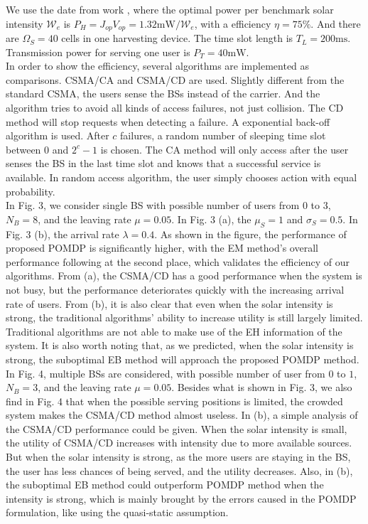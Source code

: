 \documentclass[conference]{IEEEtran}
\begin{document}
We use the date from work \cite{circuit}, where the optimal power per benchmark solar intensity \(\mathcal{W}_e\)
is \(P_H = J_{op}V_{op} = 1.32\mbox{mW}/\mathcal{W}_e\), with a efficiency \(\eta = 75 \%\).
And there are \(\Omega_S = 40\) cells in one harvesting device.
The time slot length is \(T_L = 200\mbox{ms}\).
Transmission power for serving one user is \(P_T = 40\mbox{mW}\).\\
\indent In order to show the efficiency, several algorithms are implemented as comparisons.
CSMA/CA and CSMA/CD are used.
Slightly different from the standard CSMA, the users sense the BSs instead of the carrier.
And the algorithm tries to avoid all kinds of access failures, not just collision.
The CD method will stop requests when detecting a failure. A exponential back-off algorithm is used.
After \(c\) failures, a random number of sleeping time slot between \(0\) and \(2^c - 1\) is chosen.
The CA method will only access after the user senses the BS in the last time slot
and knows that a successful service is available.
In random access algorithm, the user simply chooses action with equal probability.\\
\indent In Fig. 3, we consider single BS with possible number of users from \(0\) to \(3\), \(N_B = 8\),
and the leaving rate \(\mu = 0.05\).
In Fig. 3 (a), the \(\mu_S = 1\) and \(\sigma_S = 0.5\). In Fig. 3 (b), the arrival rate \(\lambda = 0.4\).
As shown in the figure, the performance of proposed POMDP is significantly higher,
with the EM method's overall performance following at the second place,
which validates the efficiency of our algorithms.
From (a), the CSMA/CD has a good performance when the system is not busy,
but the performance deteriorates quickly with the increasing arrival rate of users.
From (b), it is also clear that even when the solar intensity is strong,
the traditional algorithms' ability to increase utility is still largely limited.
Traditional algorithms are not able to make use of the EH information of the system.
It is also worth noting that, as we predicted, when the solar intensity is strong,
the suboptimal EB method will approach the proposed POMDP method.\\
\indent In Fig. 4, multiple BSs are considered, with possible number of user from \(0\) to \(1\),
\(N_B = 3\), and the leaving rate \(\mu = 0.05\).
Besides what is shown in Fig. 3, we also find in Fig. 4
that when the possible serving positions is limited, the crowded system makes the CSMA/CD method almost useless.
In (b), a simple analysis of the CSMA/CD performance could be given.
When the solar intensity is small, the utility of CSMA/CD increases with intensity due to more available sources.
But when the solar intensity is strong, as the more users are staying in the BS,
the user has less chances of being served, and the utility decreases.
Also, in (b), the suboptimal EB method could outperform POMDP method when the intensity is strong,
which is mainly brought by the errors caused in the POMDP formulation, like using the quasi-static assumption.
\end{document}
